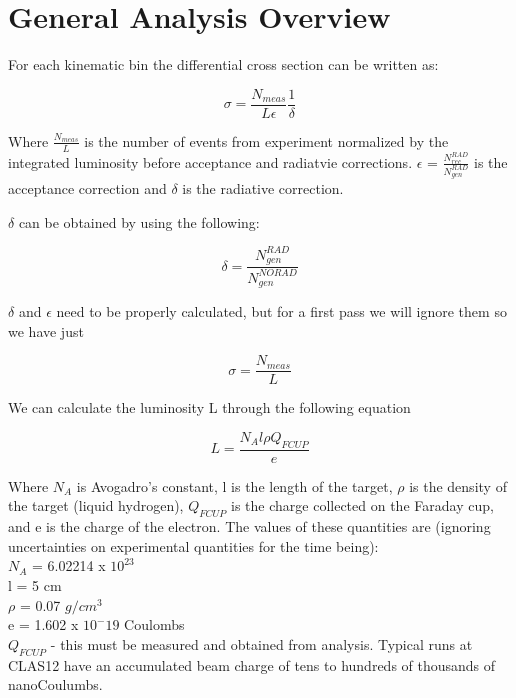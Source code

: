 \section{General Analysis Overview}



For each kinematic bin the differential cross section can be written as:

\begin{equation}
    \sigma = \frac{N_{meas}}{L \epsilon}\frac{1}{\delta}
\end{equation}

Where $\frac{N_{meas}}{L}$ is the number of events from experiment normalized by the integrated luminosity before acceptance and radiatvie corrections. $\epsilon$ = $\frac{N^{RAD}_{rec}}{{N^{RAD}_{gen}}}$ is the acceptance correction and $\delta$ is the radiative correction.



$\delta$ can be obtained by using the following:

\begin{equation}
    \delta = \frac{N^{RAD}_{gen}}{N^{NORAD}_{gen}}
\end{equation}

$\delta$ and $\epsilon$ need to be properly calculated, but for a first pass we will ignore them so we have just


\begin{equation}
    \sigma = \frac{N_{meas}}{L}
\end{equation}

We can calculate the luminosity L through the following equation

\begin{equation}
    L = \frac{N_A l \rho Q_{FCUP}}{e}
\end{equation}

Where $N_A$ is Avogadro's constant, l is the length of the target,  $\rho$ is the density of the target (liquid hydrogen), $Q_{FCUP}$ is the charge collected on the Faraday cup, and e is the charge of the electron. The values of these quantities are (ignoring uncertainties on experimental quantities for the time being):\\

$N_A$ = 6.02214 x $10^{23}$\\
l = 5 cm\\
$\rho$ = 0.07 $g/cm^3$\\
e = 1.602 x $10^-19$ Coulombs\\
$Q_{FCUP}$ - this must be measured and obtained from analysis. Typical runs at CLAS12 have an accumulated beam charge of tens to hundreds of thousands of nanoCoulumbs. 

